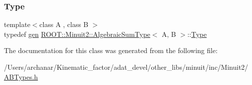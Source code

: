 \mbox{\label{classROOT_1_1Minuit2_1_1AlgebraicSumType_a9bf43a13ee66f334fb43c489c5bfa2e5}} 
\subsubsection{\texorpdfstring{Type}{Type}\hspace{0.1cm}{\footnotesize\ttfamily [2/2]}}
{\footnotesize\ttfamily template$<$class A , class B $>$ \\
typedef \mbox{\hyperlink{classROOT_1_1Minuit2_1_1gen}{gen}} \mbox{\hyperlink{classROOT_1_1Minuit2_1_1AlgebraicSumType}{R\+O\+O\+T\+::\+Minuit2\+::\+Algebraic\+Sum\+Type}}$<$ A, B $>$\+::\mbox{\hyperlink{classROOT_1_1Minuit2_1_1AlgebraicSumType_a9bf43a13ee66f334fb43c489c5bfa2e5}{Type}}}



The documentation for this class was generated from the following file\+:\begin{DoxyCompactItemize}
\item 
/\+Users/archanar/\+Kinematic\+\_\+factor/adat\+\_\+devel/other\+\_\+libs/minuit/inc/\+Minuit2/\mbox{\hyperlink{other__libs_2minuit_2inc_2Minuit2_2ABTypes_8h}{A\+B\+Types.\+h}}\end{DoxyCompactItemize}
